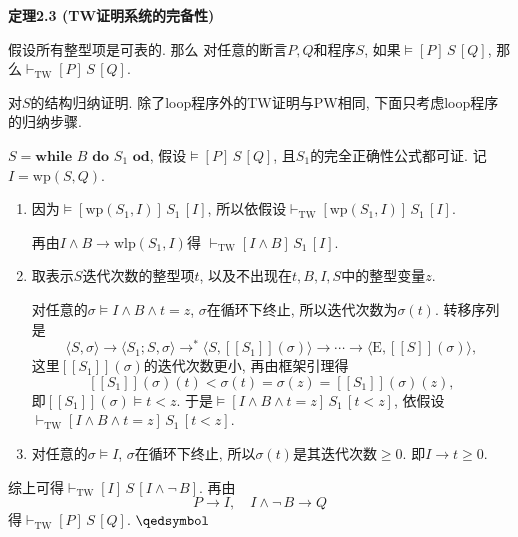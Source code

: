 \documentclass[UTF8]{ctexart}
\begin{document}
\hypertarget{sec:定理2.3}{}
\noindent\textbf{定理2.3 (TW证明系统的完备性)}

假设所有整型项是可表的. 那么
对任意的断言$P,Q$和程序$S$, 如果$\models[P]\,S\,[Q]$,
那么$\vdash_{\mathrm{TW}}[P]\,S\,[Q]$.


对$S$的结构归纳证明. 除了loop程序外的TW证明与PW相同,
下面只考虑loop程序的归纳步骤.

$S=\mathbf{while}\,\,B\,\,\mathbf{do}\,\,S_1\,\,\mathbf{od}$,
假设$\models[P]\,S\,[Q]$, 且$S_1$的完全正确性公式都可证. 记$I=\mathrm{wp}(S,Q)$.
\vspace{1pt}
\begin{enumerate}
    \item 因为$\models[\mathrm{wp}(S_1,I)]\,S_1\,[I]$,
    所以依假设$\vdash_{\mathrm{TW}}[\mathrm{wp}(S_1,I)]\,S_1\,[I]$.

    \hspace{2.17em}
    再由$I\land B\to\mathrm{wlp}(S_1,I)$得
    $\vdash_{\mathrm{TW}}[I\land B]\,S_1\,[I]$.

    \item 取表示$S$迭代次数的整型项$t$, 以及不出现在$t,B,I,S$中的整型变量$z$.
    
    \hspace{2.17em}
    对任意的$\sigma\models I\land B\land t=z$, $\sigma$在循环下终止,
    所以迭代次数为$\sigma(t)$. 转移序列是
    \[
        \langle S,\sigma\rangle\to\langle S_1;S,\sigma\rangle\to^*
        \langle S,[\![S_1]\!](\sigma)\rangle\to\cdots\to
        \langle\mathrm{E},[\![S]\!](\sigma)\rangle,
    \]
    这里$[\![S_1]\!](\sigma)$的迭代次数更小, 再由框架引理得
    \[
        [\![S_1]\!](\sigma)(t)<\sigma(t)=\sigma(z)=[\![S_1]\!](\sigma)(z),
    \]
    即$[\![S_1]\!](\sigma)\models t<z$. 于是$\models[I\land B\land t=z]\,S_1\,
    [t<z]$, 依假设$\vdash_{\mathrm{TW}}[I\land B\land t=z]\,S_1\,[t<z]$.

    \item 对任意的$\sigma\models I$, $\sigma$在循环下终止,
    所以$\sigma(t)$是其迭代次数$\geqslant 0$. 即$I\to t\geqslant 0$.
\end{enumerate}

\vspace{3pt}
综上可得$\vdash_{\mathrm{TW}}[I]\,S\,[I\land\neg\,B]$. 再由
\[
    P\to I,\quad I\land\neg\,B\to Q
\]
得$\vdash_{\mathrm{TW}}[P]\,S\,[Q]$. \hfill $\qedsymbol$
\end{document}
